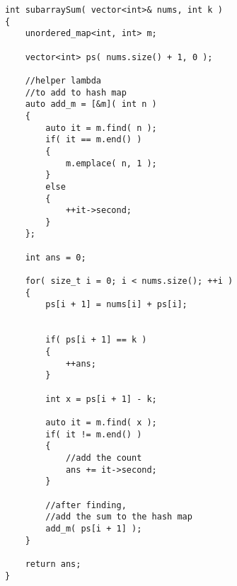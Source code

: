 \setcounter{lstlisting}{0}
\begin{lstlisting}[style=customc, caption={Prefix Sum}]
int subarraySum( vector<int>& nums, int k )
{
    unordered_map<int, int> m;

    vector<int> ps( nums.size() + 1, 0 );

    //helper lambda
    //to add to hash map
    auto add_m = [&m]( int n )
    {
        auto it = m.find( n );
        if( it == m.end() )
        {
            m.emplace( n, 1 );
        }
        else
        {
            ++it->second;
        }
    };

    int ans = 0;

    for( size_t i = 0; i < nums.size(); ++i )
    {
        ps[i + 1] = nums[i] + ps[i];


        if( ps[i + 1] == k )
        {
            ++ans;
        }

        int x = ps[i + 1] - k;

        auto it = m.find( x );
        if( it != m.end() )
        {
            //add the count
            ans += it->second;
        }

        //after finding,
        //add the sum to the hash map
        add_m( ps[i + 1] );
    }

    return ans;
}
\end{lstlisting}